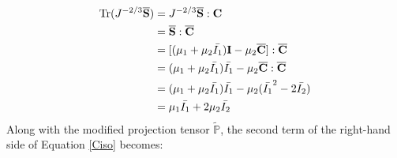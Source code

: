 \begin{equation}
\begin{split}
\mathrm{Tr}(J^{-2/3}\overline{\bold{S}}) &= J^{-2/3}{\overline{\bold{S}}} : {\bold{C}} \\
&= \overline{\bold{S}} : \overline{\bold{C}} \\
&= [(\mu_1 + \mu_2{\bar{I_1}})\bold{I} - \mu_2{\overline{\bold{C}}}] : \overline{\bold{C}} \\
&= (\mu_1 + \mu_2\bar{I_1})\bar{I_1} - \mu_2{\overline{\bold{C}}} : {\overline{\bold{C}}} \\
&= (\mu_1 + \mu_2\bar{I_1})\bar{I_1} - \mu_2({\bar{I_1}}^2 - 2\bar{I_2}) \\
&= \mu_1\bar{I_1} + 2\mu_2\bar{I_2}
\end{split}
\end{equation}
Along with the modified projection tensor $\tilde{\mathbb{P}}$, the second term of the right-hand side of Equation \ref{Ciso} becomes:

